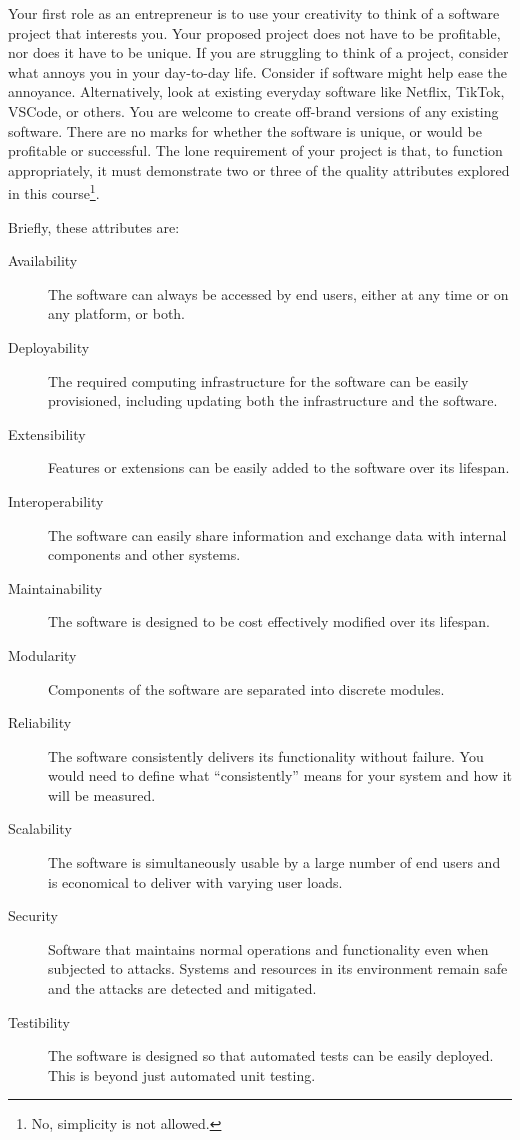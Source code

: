 \documentclass{csse4400}
\begin{document}
Your first role as an entrepreneur is to use your creativity to think of a software project that interests you.
Your proposed project does not have to be profitable, nor does it have to be unique.
If you are struggling to think of a project, consider what annoys you in your day-to-day life.
Consider if software might help ease the annoyance.
Alternatively, look at existing everyday software like Netflix, TikTok, VSCode, or others.
You are welcome to create off-brand versions of any existing software.
There are no marks for whether the software is unique, or would be profitable or successful.
The lone requirement of your project is that, to function appropriately, it must demonstrate two or three of the quality attributes 
explored in this course\footnote{No, simplicity is not allowed.}.

\newpage\noindent
Briefly, these attributes are:
\begin{description}
    \item[Availability] The software can always be accessed by end users, either at any time or on any platform, or both.
    \item[Deployability] The required computing infrastructure for the software can be easily provisioned, including updating both the infrastructure and the software.
    \item[Extensibility] Features or extensions can be easily added to the software over its lifespan.
    \item[Interoperability] The software can easily share information and exchange data with internal components and other systems.
    \item[Maintainability] The software is designed to be cost effectively modified over its lifespan.
    \item[Modularity] Components of the software are separated into discrete modules.
    \item[Reliability] The software consistently delivers its functionality without failure. You would need to define what ``consistently'' means for your system and how it will be measured.
    \item[Scalability] The software is simultaneously usable by a large number of end users and is economical to deliver with varying user loads.
    \item[Security] Software that maintains normal operations and functionality even when subjected to attacks.
                    Systems and resources in its environment remain safe and the attacks are detected and mitigated.
    \item[Testibility] The software is designed so that automated tests can be easily deployed. This is beyond just automated unit testing.
\end{description}
\end{document}
